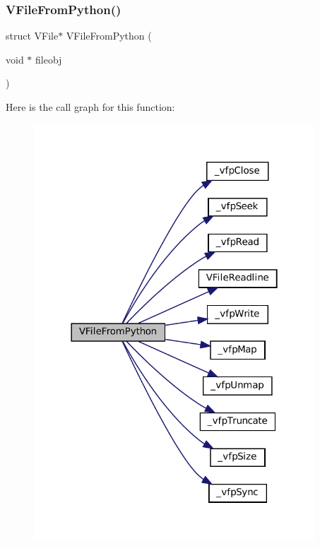 \subsubsection{\texorpdfstring{V\+File\+From\+Python()}{VFileFromPython()}}
{\footnotesize\ttfamily struct V\+File$\ast$ V\+File\+From\+Python (\begin{DoxyParamCaption}\item[{void $\ast$}]{fileobj }\end{DoxyParamCaption})}

Here is the call graph for this function\+:
\nopagebreak
\begin{figure}[H]
\begin{center}
\leavevmode
\includegraphics[width=298pt]{vfs-py_8c_a2c8828e68e769f2b3de7641e6d12feea_cgraph}
\end{center}
\end{figure}
